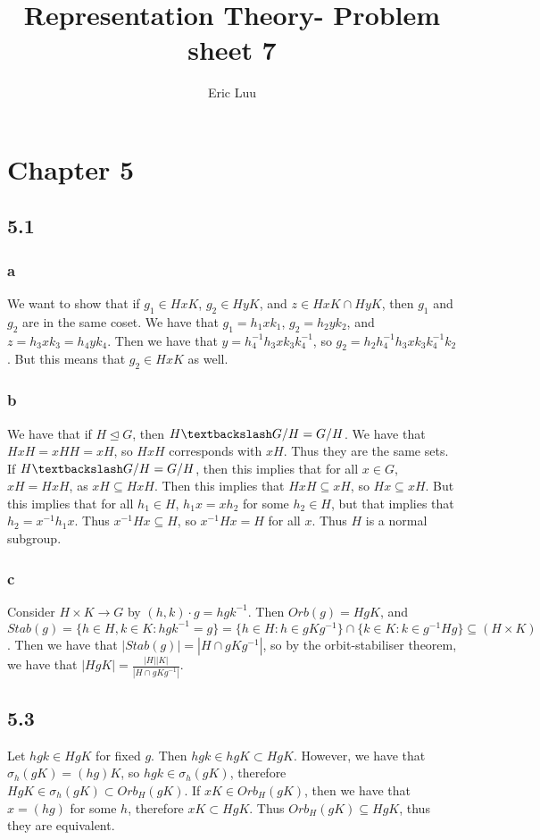 \documentclass[]{article}
\title{Representation Theory- Problem sheet 7}
\author{Eric Luu}
\begin{document}
\maketitle

\section*{Chapter 5}
\subsection*{5.1}
\subsubsection*{a}
We want to show that if $g_1 \in HxK$, $g_2 \in H y K$, and $z \in Hx K \cap H y K$, then $g_1$ and $g_2$ are in the same coset. We have that $g_1 = h_1 x k_1$, $g_2 = h_2 y k_2$, and $z = h_3 x k_3 = h_4 y k_4$. Then we have that $y = h_4^{-1} h_3 x k_3 k_4^{-1}$, so $g_2 = h_2 h_4^{-1} h_3 x k_3 k_4^{-1} k_2$. But this means that $g_2 \in H x K$ as well. 
\subsubsection*{b}
We have that if $H \unlhd G$, then $H \textbackslash G / H = G/H$. We have that $H x H = x HH = x H$, so $H x H$ corresponds with $xH$. Thus they are the same sets. If $H \textbackslash G / H = G/H$, then this implies that for all $x \in G$, $xH = H x H$, as $xH \subseteq H x H$. Then this implies that $H x H \subseteq x H$, so $Hx \subseteq x H$. But this implies that for all $h_1 \in H$, $h_1 x = x h_2$ for some $h_2 \in H$, but that implies that $h_2 = x^{-1} h_1 x$. Thus $x^{-1} H x \subseteq H$, so $x^{-1} H x = H$ for all $x$. Thus $H$ is a normal subgroup. 

\subsubsection*{c}
Consider $H \times K \rightarrow G$ by $(h, k) \cdot g = h g k^{-1}$. Then $Orb(g) = H g K$, and $Stab(g) = \lbrace h \in H, k \in K: hgk^{-1} = g \rbrace = \lbrace h \in H : h \in g K g^{-1} \rbrace \cap \lbrace k \in K: k \in g^{-1} H g\rbrace \subseteq(H \times K)$. Then we have that $|Stab(g)| = |H \cap g K g^{-1}|$, so by the orbit-stabiliser theorem, we have that $|H g K| = \frac{|H| |K|}{|H \cap g K g^{-1}|}$.

\subsection*{5.3}
Let $hgk \in H g K$ for fixed $g$. Then $hgk \in h g K \subset H g K$. However, we have that $\sigma_h(gK) = (hg)K$, so $hgk \in \sigma_h(gK)$, therefore $H g K \in \sigma_h(gK) \subset Orb_H(gK)$. If $xK \in Orb_H(gK)$, then we have that $x = (hg)$ for some $h$, therefore $x K \subset H g K$. Thus $Orb_H(gK) \subseteq HgK$, thus they are equivalent. 
\end{document}
